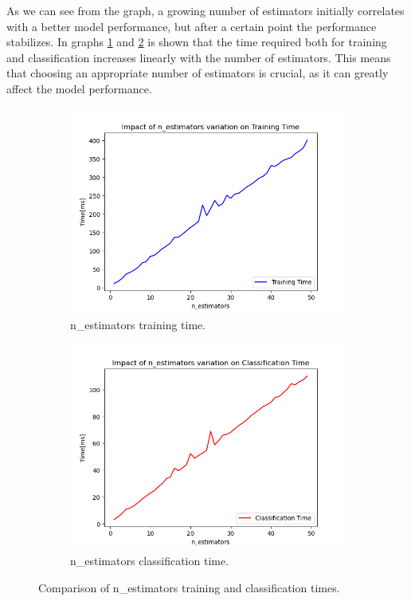 \documentclass[futureinternet,article,submit,pdftex,moreauthors]{Definitions/mdpi}
\begin{document}
As we can see from the graph, a growing number of estimators initially correlates with a better model performance, but after a certain point the performance stabilizes. 
In graphs \ref{fig:n_estimators_training_time} and \ref{fig:n_estimators_classification_time} is shown that the time required both for training and classification increases linearly with the number of estimators.
This means that choosing an appropriate number of estimators is crucial, as it can greatly affect the model performance. 

\begin{figure}[H]
    \centering
    \begin{subfigure}{0.45\textwidth}
        \centering
        \includegraphics[width=\textwidth]{img/nEstimatorsTrainingTime.png}
        \caption{n\_estimators training time.}
        \label{fig:n_estimators_training_time}
    \end{subfigure}
    \hfill
    \begin{subfigure}{0.45\textwidth}
        \centering
        \includegraphics[width=\textwidth]{img/nEstimatorsClassificationTime.png}
        \caption{n\_estimators classification time.}
        \label{fig:n_estimators_classification_time}
    \end{subfigure}
    \caption{Comparison of n\_estimators training and classification times.}
    \label{fig:estimators_time_comparison}
\end{figure}
\end{document}
